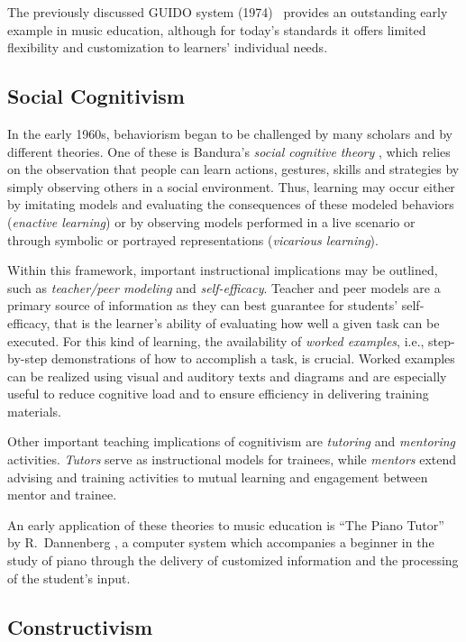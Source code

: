 \documentclass[10pt,journal,compsoc]{IEEEtran}
\begin{document}
The previously discussed GUIDO system (1974)~\cite{hofstetter1975guido,eddins1981brief} provides an outstanding early example in music education, although for today's standards it offers limited flexibility and customization to learners' individual needs.


\subsection{Social Cognitivism}
In the early 1960s, behaviorism began to be challenged by many scholars and by different theories. One of these is Bandura's \textit{social cognitive theory} \cite{bandura1986social}, which relies on the observation that people can learn actions, gestures, skills and strategies by simply observing others in a social environment. Thus, learning may occur either by imitating models and evaluating the consequences of these modeled behaviors (\textit{enactive learning}) or by observing models performed in a live scenario or through symbolic or portrayed representations (\textit{vicarious learning}). 

Within this framework, important instructional implications may be outlined, such as \textit{teacher/peer modeling} and \textit{self-efficacy}. Teacher and peer models are a primary source of information as they can best guarantee for students' self-efficacy, that is the learner's ability of evaluating how well a given task can be executed. For this kind of learning, the availability of \textit{worked examples}, i.e., step-by-step demonstrations of how to accomplish a task, is crucial. Worked examples can be realized using visual and auditory texts and diagrams \cite{kalyuga2000incorporating} and are especially useful to reduce cognitive load and to ensure efficiency in delivering training materials. 

Other important teaching implications of cognitivism are \textit{tutoring} and \textit{mentoring} activities. \textit{Tutors} serve as instructional models for trainees, while \textit{mentors} extend advising and training activities to mutual learning and engagement between mentor and trainee. 

An early application of these theories to music education is ``The Piano Tutor'' by R.\ Dannenberg \cite{dannenberg1990computer}, a computer system which accompanies a beginner in the study of piano through the delivery of customized information and the processing of the student's input.

\subsection{Constructivism}
\end{document}
